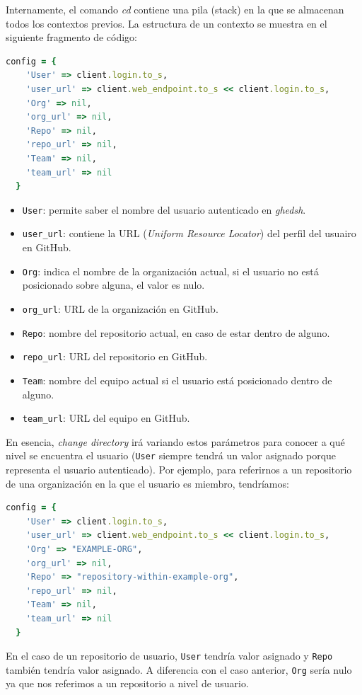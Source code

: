 Internamente, el comando {\it cd} contiene una pila (stack\cite{B19}) en la que se almacenan todos los contextos previos. La estructura de un contexto se muestra en el siguiente fragmento de código:

\begin{lstlisting}[language=Ruby]
  config = {
    'User' => client.login.to_s,
  	'user_url' => client.web_endpoint.to_s << client.login.to_s,
    'Org' => nil,
    'org_url' => nil,
    'Repo' => nil,
    'repo_url' => nil,
    'Team' => nil,
    'team_url' => nil
  }
\end{lstlisting}

\begin{itemize}
	\item \verb|User|: permite saber el nombre del usuario autenticado en {\it ghedsh}.
	\item \verb|user_url|: contiene la URL ({\it Uniform Resource Locator}\cite{B20}) del perfil del usuairo en GitHub.
	\item \verb|Org|: indica el nombre de la organización actual, si el usuario no está posicionado sobre alguna, el valor es nulo.
	\item \verb|org_url|: URL de la organización en GitHub.
	\item \verb|Repo|: nombre del repositorio actual, en caso de estar dentro de alguno.
	\item \verb|repo_url|: URL del repositorio en GitHub.
	\item \verb|Team|: nombre del equipo actual si el usuario está posicionado dentro de alguno.
	\item \verb|team_url|: URL del equipo en GitHub.
\end{itemize}

En esencia, {\it change directory} irá variando estos parámetros para conocer a qué nivel se encuentra el usuario (\verb|User| siempre tendrá un valor asignado porque representa el usuario autenticado).
Por ejemplo, para referirnos a un repositorio de una organización en la que el usuario es miembro, tendríamos:
\begin{lstlisting}[language=Ruby]
	config = {
    'User' => client.login.to_s,
  	'user_url' => client.web_endpoint.to_s << client.login.to_s,
    'Org' => "EXAMPLE-ORG",
    'org_url' => nil,
    'Repo' => "repository-within-example-org",
    'repo_url' => nil,
    'Team' => nil,
    'team_url' => nil
  }
\end{lstlisting}
En el caso de un repositorio de usuario, \verb|User| tendría valor asignado y \verb|Repo| también tendría valor asignado. A diferencia con el caso anterior, \verb|Org| sería nulo ya que nos referimos a un repositorio a nivel de usuario.
\bigskip

